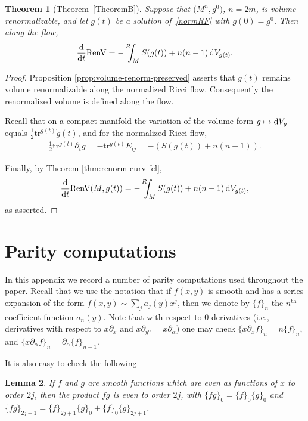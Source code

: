 \documentclass[pdftex]{sigma}
\numberwithin{equation}{section}
\newtheorem{Theorem}{Theorem}[section]
\newtheorem{Lemma}[Theorem]{Lemma}
\newcommand{\RenV}{\mathrm{RenV}}
\newcommand{\gin}{{g^0}}
\newcommand{\tr}{\mathrm{tr}}
\newcommand{\Renint}{\mathop{\vphantom{T}}^R \! \! \! \int}
\begin{document}
\begin{Theorem}[Theorem~\ref{TheoremB}]\label{theorem4.5}
Suppose that $\big(M^n,\gin\big)$, $n = 2m$, is volume renormalizable, and let $g(t)$ be a solution of~\eqref{normRF} with $g(0) = \gin$. Then along the flow,
\begin{gather*}%
\frac{{\rm d}}{{\rm d}t} \RenV = -\Renint_M S(g(t)) + n(n-1) \, {\rm d} V_{g(t)}.
\end{gather*}
\end{Theorem}
\begin{proof}Proposition \ref{prop:volume-renorm-preserved} asserts that $g(t)$ remains volume renormalizable along the normalized Ricci flow. Consequently the renormalized volume is defined along the flow.

Recall that on a compact manifold the variation of the volume form $g \mapsto {\rm d}V_g$ equals $\frac{1}{2} \tr^{g(t)} \dot{g}(t)$, and for the normalized Ricci flow,
\begin{gather*}%
\frac{1}{2} \tr^{g(t)}\partial_t g = - \tr^{g(t)} E_{ij} = -\left( S(g(t)) + n(n-1) \right).
\end{gather*}

Finally, by Theorem \ref{thm:renorm-curv-fcl},
\begin{gather*}%
\frac{{\rm d}}{{\rm d}t} \RenV(M, g(t)) = -\Renint_M S(g(t)) + n(n-1) \,{\rm d}V_{g(t)},
\end{gather*}
as asserted.
\end{proof}

\appendix

\section{Parity computations} \label{appendix}

In this appendix we record a number of parity computations used throughout the paper. Recall that we use the notation that if $f(x,y)$ is smooth and has a series expansion of the form $f(x,y) \sim \sum_j a_j(y) x^j$, then we denote by $\{f\}_{n}$ the $n^{\mathrm{th}}$ coefficient function $a_n(y)$. Note that with respect to $0$-derivatives (i.e., derivatives with respect to $x \partial_x$ and $x \partial_{y^{\alpha}} = x \partial_{\alpha}$) one may check $\{ x \partial_x f\}_n = n \{f \}_{n},$ and $\{ x \partial_{{\alpha}} f \}_n = \partial_{{\alpha}} \{f\}_{n-1}.$

It is also easy to check the following
\begin{Lemma} \label{lemma:expansion} If $f$ and $g$ are smooth functions which are even as functions of $x$ to order $2j$, then the product $fg$ is even to order $2j$, with $\{ fg\}_0 = \{f\}_0\{g\}_0$ and $\{ fg\}_{2j+1} = \{ f \}_{2j+1} \{g\}_0 + \{f\}_0 \{g\}_{2j+1}$.
\end{Lemma}
\end{document}
